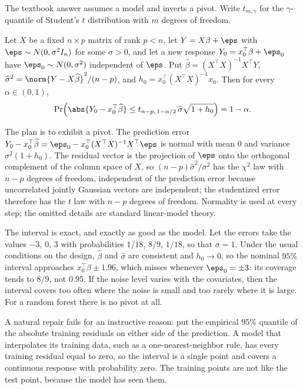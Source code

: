 \begin{refsection}
The textbook answer assumes a model and inverts a pivot. Write $t_{m,\gamma}$ for the $\gamma$-quantile of Student's $t$ distribution with $m$ degrees of freedom.

\begin{proposition}\label{prop:conformal:gauss}
Let $X$ be a fixed $n\times p$ matrix of rank $p<n$, let $Y=X\beta+\eps$ with $\eps\sim N(0,\sigma^2I_n)$ for some $\sigma>0$, and let a new response $Y_0=x_0^{\top}\beta+\eps_0$ have $\eps_0\sim N(0,\sigma^2)$ independent of $\eps$. Put $\widehat\beta=(X^{\top}X)^{-1}X^{\top}Y$, $\widehat\sigma^2=\norm{Y-X\widehat\beta}^2/(n-p)$, and $h_0=x_0^{\top}(X^{\top}X)^{-1}x_0$. Then for every $\alpha\in(0,1)$,
\[
\Pr\Bigl(\abs{Y_0-x_0^{\top}\widehat\beta}\le t_{n-p,\,1-\alpha/2}\,\widehat\sigma\sqrt{1+h_0}\Bigr)=1-\alpha.
\]
\end{proposition}

\begin{proofsketch}
The plan is to exhibit a pivot. The prediction error $Y_0-x_0^{\top}\widehat\beta=\eps_0-x_0^{\top}(X^{\top}X)^{-1}X^{\top}\eps$ is normal with mean $0$ and variance $\sigma^2(1+h_0)$. The residual vector is the projection of $\eps$ onto the orthogonal complement of the column space of $X$, so $(n-p)\widehat\sigma^2/\sigma^2$ has the $\chi^2$ law with $n-p$ degrees of freedom, independent of the prediction error because uncorrelated jointly Gaussian vectors are independent; the studentized error therefore has the $t$ law with $n-p$ degrees of freedom. Normality is used at every step; the omitted details are standard linear-model theory.
\end{proofsketch}

The interval is exact, and exactly as good as the model. Let the errors take the values $-3$, $0$, $3$ with probabilities $1/18$, $8/9$, $1/18$, so that $\sigma=1$. Under the usual conditions on the design, $\widehat\beta$ and $\widehat\sigma$ are consistent and $h_0\to0$, so the nominal $95\%$ interval approaches $x_0^{\top}\beta\pm1.96$, which misses whenever $\eps_0=\pm3$: its coverage tends to $8/9$, not $0.95$. If the noise level varies with the covariates, then the interval covers too often where the noise is small and too rarely where it is large. For a random forest there is no pivot at all.

A natural repair fails for an instructive reason: put the empirical $95\%$ quantile of the absolute training residuals on either side of the prediction. A model that interpolates its training data, such as a one-nearest-neighbor rule, has every training residual equal to zero, so the interval is a single point and covers a continuous response with probability zero. The training points are not like the test point, because the model has seen them.


\end{refsection}
